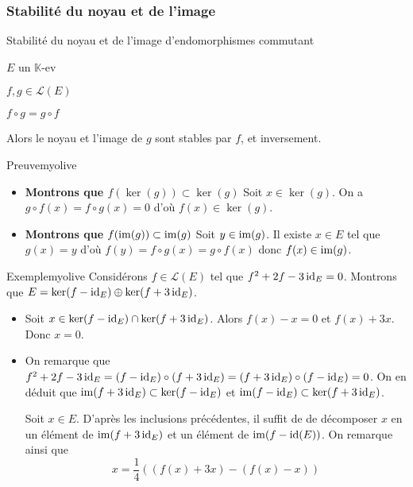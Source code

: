     \subsubsection{Stabilité du noyau et de l’image}

    \begin{prop}{Stabilité du noyau et de l’image d’endomorphismes commutant}{}
        \begin{soit}
            \item $E$ un $\mathbb{K}$-ev 
            \item $f,g \in \mathcal{L}(E)$
        \end{soit}
        \begin{suppose}
            \item $f \circ g = g \circ f$
        \end{suppose}
        Alors le noyau et l’image de $g$ sont stables par $f$, et inversement.
    \end{prop}

    \begin{demo}{Preuve}{myolive}
        \begin{itemize}
            \item \textbf{Montrons que $f(\ker(g)) \subset \ker(g)$} \quad Soit $x \in \ker(g)$. On a $g \circ f(x) = f \circ g(x) = 0$ d’où $f(x) \in \ker(g)$. 
            \item \textbf{Montrons que $f(\operatorname{im}(g)) \subset \operatorname{im}(g)$} \quad Soit $y \in \operatorname{im}(g)$. Il existe $x \in E$ tel que $g(x) = y$ d’où $f(y) = f \circ g(x) = g \circ f(x)$ donc $f(x) \in \operatorname{im}(g)$.
        \end{itemize}
    \end{demo}

    \begin{omed}{Exemple}{myolive}
        Considérons $f \in \mathcal{L}(E)$ tel que $f^2 + 2 f - 3 \operatorname{id}_E = 0$. Montrons que $E = \ker(f - \operatorname{id}_E) \oplus \ker(f + 3 \operatorname{id}_E)$.
        \begin{itemize}
            \item Soit $x \in \ker(f - \operatorname{id}_E) \cap \ker(f + 3 \operatorname{id}_E)$. Alors $f(x) - x = 0$ et $f(x) + 3x$. Donc $x = 0$.
            \item On remarque que $f^2 + 2f - 3 \operatorname{id}_E = (f - \operatorname{id}_E) \circ (f + 3 \operatorname{id}_E) = (f + 3 \operatorname{id}_E) \circ (f - \operatorname{id}_E) = 0$. On en déduit que $\operatorname{im}(f + 3 \operatorname{id}_E) \subset \ker(f - \operatorname{id}_E)$ et $\operatorname{im}(f - \operatorname{id}_E) \subset \ker(f + 3 \operatorname{id}_E)$.
            
            Soit $x \in E$. D’après les inclusions précédentes, il suffit de de décomposer $x$ en un élément de $\operatorname{im}(f + 3 \operatorname{id}_E)$ et un élément de $\operatorname{im}(f - \operatorname{id}(E))$. On remarque ainsi que 
            \[ x = \frac{1}{4} \left( \left(f(x) + 3x\right) - \left(f(x) - x\right) \right) \]
        \end{itemize}
    \end{omed}

